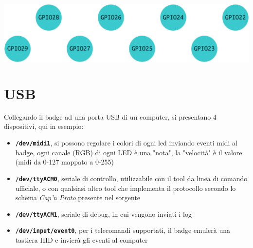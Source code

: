 \documentclass[10pt]{datasheet}
\newcommand*\circled[1]{\tikz[baseline=(char.base)]{
		\node[shape=circle,draw,inner sep=2pt, fill=white] (char) {#1};}}
\begin{document}
	\vfill\break
	\vspace*{-30pt}
	\begin{center}
		\includegraphics[scale=0.75]{gpio}

		
	\end{center}
\vspace*{-20pt}
\section{USB}
Collegando il badge ad una porta USB di un computer, si presentano 4 dispositivi, qui in esempio:
\vspace*{-10pt}
\begin{itemize}[itemsep=1pt]
	\item {\textbf{\texttt{/dev/midi1}}, si possono regolare i colori di ogni led inviando eventi midi al badge, ogni canale (RGB) di ogni LED è una "nota", la "velocità" è il valore (midi da 0-127 mappato a 0-255)}
	\item{\textbf{\texttt{/dev/ttyACM0}}, seriale di controllo, utilizzabile con il tool da linea di comando ufficiale, o con qualsiasi altro tool che implementa il protocollo secondo lo schema \textit{Cap'n Proto} presente nel sorgente}
	\item{\textbf{\texttt{/dev/ttyACM1}}, seriale di debug, in cui vengono inviati i log}
	\item{\textbf{\texttt{/dev/input/event0}}}, per i telecomandi supportati, il badge emulerà una tastiera HID e invierà gli eventi al computer
\end{itemize}
\vspace*{-10pt}
\end{document}
